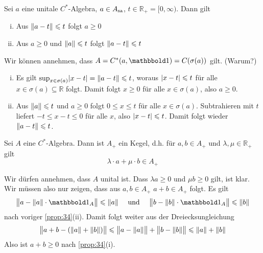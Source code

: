 \begin{proposition}[label=prop:34,{name=[Einfache Abschätzungen für positive Elemente]}]
	Sei $a$ eine unitale $C^*$-Algebra, $a \in A_{\sa}$, $t \in \mathbb{R}_+ = [0,\infty)$. Dann gilt
	\begin{enumerate}[(i),itemsep=2pt]
		\item Aus $\norm*{a-t}\le t$ folgt $a \ge 0$
		\item Aus $a \ge 0$ und $\norm*{a}\le t$ folgt $\norm*{a-t}\le t$ 
	\end{enumerate}
\end{proposition}
\begin{beweis}
	Wir können annehmen, dass $A=C^*(a,\ind)=C \enbrace*{\sigma(a)}$ gilt. (Warum?)
	\begin{enumerate}[(i),itemsep=2pt]
		\item Es gilt $\sup_{x \in \sigma(a)} \abs*{x-t} = \norm*{a-t} \le t$, woraus $\abs*{x-t} \le t $ für alle $x \in \sigma(a)\subseteq \mathbb{R}$ folgt. Damit folgt
		$x \ge 0$ für alle $x \in \sigma(a)$, also $a \ge 0$.
		\item Aus $\norm*{a}\le t$ und $a \ge 0$ folgt $0 \le x \le t$ für alle $x \in \sigma(a)$. 
		Subtrahieren mit $t$ liefert $-t \le x-t \le 0$ für alle $x$, also $\abs*{x-t}\le t $. 
		Damit folgt wieder $\norm*{a-t}\le t$. \qedhere
	\end{enumerate}
\end{beweis}

\begin{korollar}[label=korr:35,{name=[Die positiven Elemente bilden einen Kegel]}]
	Sei $A$ eine $C^*$-Algebra. 
	Dann ist $A_+$ ein Kegel, d.h. für $a,b \in A_+$ und $\lambda, \mu \in \mathbb{R}_+$ gilt 
	\[
		\lambda \cdot a + \mu \cdot b \in A_+ 
	\]
\end{korollar}
\begin{beweis}
	Wir dürfen annehmen, dass $A$ unital ist. Dass $\lambda a \ge 0$ und $\mu b  \ge 0$ gilt, ist klar. Wir müssen also nur zeigen, dass aus $a,b\in A_+$ $a+b\in A_+$ folgt. Es gilt
	\begin{align}
		\norm[\big]{a- \norm*{a}\cdot \ind_A} \le \norm*{a} \quad \text{ und } \quad \norm[\big]{b- \norm*{b} \cdot \ind_A} \le \norm*{b}
	\end{align}
	nach voriger \autoref{prop:34}(ii). Damit folgt weiter aus der Dreiecksungleichung
	\[
		\norm[\big]{a+b - \enbrace*{\norm*{a} + \norm*{b}}} \le \norm[\big]{a - \norm*{a}} + \norm[\big]{b - \norm*{b}} \le \norm*{a} + \norm*{b}
	\]
	Also ist $a+b \ge 0$ nach \autoref{prop:34}(i). 
\end{beweis}

